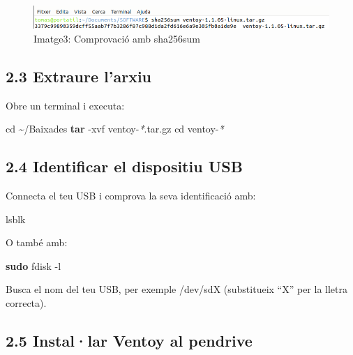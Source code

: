 \documentclass[
  12 pt,
  a4paper,
]{article}
\newenvironment{Shaded}{\begin{snugshade}}{\end{snugshade}}
\newcommand{\AttributeTok}[1]{\textcolor[rgb]{0.13,0.29,0.53}{#1}}
\newcommand{\BuiltInTok}[1]{#1}
\newcommand{\ExtensionTok}[1]{#1}
\newcommand{\FunctionTok}[1]{\textcolor[rgb]{0.13,0.29,0.53}{\textbf{#1}}}
\newcommand{\NormalTok}[1]{#1}
\newcommand{\PreprocessorTok}[1]{\textcolor[rgb]{0.56,0.35,0.01}{\textit{#1}}}
\begin{document}
\begin{figure}
\centering
\includegraphics{png/sha256sum.png}
\caption{Imatge3: Comprovació amb sha256sum}
\end{figure}

\subsection{2.3 Extraure l'arxiu}\label{extraure-larxiu}

Obre un terminal i executa:

\begin{Shaded}
\begin{Highlighting}[]
\BuiltInTok{cd}\NormalTok{ \textasciitilde{}/Baixades}
\FunctionTok{tar} \AttributeTok{{-}xvf}\NormalTok{ ventoy{-}}\PreprocessorTok{*}\NormalTok{.tar.gz}
\BuiltInTok{cd}\NormalTok{ ventoy{-}}\PreprocessorTok{*}
\end{Highlighting}
\end{Shaded}

\subsection{2.4 Identificar el dispositiu
USB}\label{identificar-el-dispositiu-usb}

Connecta el teu USB i comprova la seva identificació amb:

\begin{Shaded}
\begin{Highlighting}[]
\ExtensionTok{lsblk}
\end{Highlighting}
\end{Shaded}

O també amb:

\begin{Shaded}
\begin{Highlighting}[]
\FunctionTok{sudo}\NormalTok{ fdisk }\AttributeTok{{-}l}
\end{Highlighting}
\end{Shaded}

Busca el nom del teu USB, per exemple /dev/sdX (substitueix ``X'' per la
lletra correcta).

\subsection{2.5 Instal·lar Ventoy al
pendrive}\label{installar-ventoy-al-pendrive}
\end{document}
